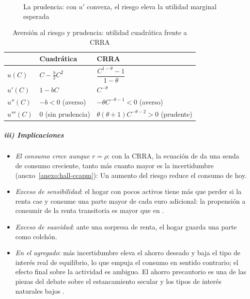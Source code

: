 \documentclass[11pt]{article}
\begin{document}
\begin{figure}[H]
\centering
\caption{La prudencia: con $u'$ convexa, el riesgo eleva la utilidad marginal esperada}\label{fig:precautorio}
\end{figure}

\begin{table}[H]
\centering
\caption{Aversión al riesgo y prudencia: utilidad cuadrática frente a CRRA}\label{tab:prudencia}
\renewcommand{\arraystretch}{1.35}
\begin{tabular}{>{\centering\arraybackslash}m{2.6cm}>{\centering\arraybackslash}m{4.4cm}>{\centering\arraybackslash}m{4.8cm}}
\toprule
\rowcolor{tceeazulpalido}
 & \textbf{Cuadrática} & \textbf{CRRA}\\
\midrule
$u(C)$ & $C-\tfrac{b}{2}C^2$ & $\dfrac{C^{1-\theta}-1}{1-\theta}$\\[6pt]
$u'(C)$ & $1-bC$ & $C^{-\theta}$\\[3pt]
$u''(C)$ & $-b<0$ (averso) & $-\theta C^{-\theta-1}<0$ (averso)\\[3pt]
\rowcolor{tceesalvia}
$u'''(C)$ & $0$ (sin prudencia) & $\theta(\theta+1)C^{-\theta-2}>0$ (prudente)\\
\bottomrule
\end{tabular}
\end{table}

\subparagraph{iii) Implicaciones}

\begin{itemize}
\item \emph{El consumo crece aunque $r=\rho$}: con la CRRA, la ecuación de  da una senda de consumo creciente, tanto más cuanto mayor es la incertidumbre (anexo~\ref{anexo:hall-ccapm}):
  Un aumento del riesgo reduce el consumo de hoy.
\item \emph{Exceso de sensibilidad}: el hogar con pocos activos tiene más que perder si la renta cae y consume una parte mayor de cada euro adicional: la propensión a consumir de la renta transitoria es mayor que en \nocite{Zeldes1989Optimal}.
\item \emph{Exceso de suavidad}: ante una sorpresa de renta, el hogar guarda una parte como colchón.
\item \emph{En el agregado}: más incertidumbre eleva el ahorro deseado y baja el tipo de interés real de equilibrio, lo que empuja el consumo en sentido contrario; el efecto final sobre la actividad es ambiguo\nocite{FernandezVillaverdeGuerronQuintana2020Uncertainty}. El ahorro precautorio es una de las piezas del debate sobre el estancamiento secular y los tipos de interés naturales bajos .
\end{itemize}
\end{document}
